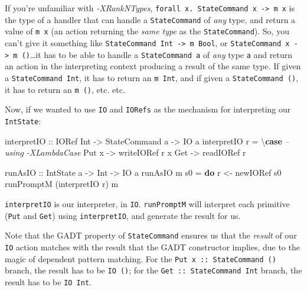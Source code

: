 \documentclass[]{article}
\newenvironment{Shaded}{}{}
\newcommand{\CommentTok}[1]{\textcolor[rgb]{0.38,0.63,0.69}{\textit{#1}}}
\newcommand{\DataTypeTok}[1]{\textcolor[rgb]{0.56,0.13,0.00}{#1}}
\newcommand{\FunctionTok}[1]{\textcolor[rgb]{0.02,0.16,0.49}{#1}}
\newcommand{\KeywordTok}[1]{\textcolor[rgb]{0.00,0.44,0.13}{\textbf{#1}}}
\newcommand{\NormalTok}[1]{#1}
\newcommand{\OtherTok}[1]{\textcolor[rgb]{0.00,0.44,0.13}{#1}}
\begin{document}
If you're unfamiliar with \emph{-XRankNTypes},
\texttt{forall\ x.\ StateCommand\ x\ -\textgreater{}\ m\ x} is the type of a
handler that can handle a \texttt{StateCommand} of \emph{any} type, and return a
value of \texttt{m\ x} (an action returning the \emph{same type} as the
\texttt{StateCommand}). So, you can't give it something like
\texttt{StateCommand\ Int\ -\textgreater{}\ m\ Bool}, or
\texttt{StateCommand\ x\ -\textgreater{}\ m\ ()}\ldots{}it has to be able to
handle a \texttt{StateCommand\ a} of \emph{any} type \texttt{a} and return an
action in the interpreting context producing a result of the same type. If given
a \texttt{StateCommand\ Int}, it has to return an \texttt{m\ Int}, and if given
a \texttt{StateCommand\ ()}, it has to return an \texttt{m\ ()}, etc. etc.

Now, if we wanted to use \texttt{IO} and \texttt{IORefs} as the mechanism for
interpreting our \texttt{IntState}:

\begin{Shaded}
\begin{Highlighting}[]
\NormalTok{interpretIO}
\OtherTok{    ::} \DataTypeTok{IORef} \DataTypeTok{Int}
    \OtherTok{->} \DataTypeTok{StateCommand}\NormalTok{ a}
    \OtherTok{->} \DataTypeTok{IO}\NormalTok{ a}
\NormalTok{interpretIO r }\FunctionTok{=}\NormalTok{ \textbackslash{}}\KeywordTok{case}           \CommentTok{-- using -XLambdaCase}
    \DataTypeTok{Put}\NormalTok{ x }\OtherTok{->}\NormalTok{ writeIORef r x}
    \DataTypeTok{Get}   \OtherTok{->}\NormalTok{ readIORef r}

\OtherTok{runAsIO ::} \DataTypeTok{IntState}\NormalTok{ a }\OtherTok{->} \DataTypeTok{Int} \OtherTok{->} \DataTypeTok{IO}\NormalTok{ a}
\NormalTok{runAsIO m s0 }\FunctionTok{=} \KeywordTok{do}
\NormalTok{    r }\OtherTok{<-}\NormalTok{ newIORef s0}
\NormalTok{    runPromptM (interpretIO r) m}
\end{Highlighting}
\end{Shaded}

\texttt{interpretIO} is our interpreter, in \texttt{IO}. \texttt{runPromptM}
will interpret each primitive (\texttt{Put} and \texttt{Get}) using
\texttt{interpretIO}, and generate the result for us.

Note that the GADT property of \texttt{StateCommand} ensures us that the
\emph{result} of our \texttt{IO} action matches with the result that the GADT
constructor implies, due to the magic of dependent pattern matching. For the
\texttt{Put\ x\ ::\ StateCommand\ ()} branch, the result has to be
\texttt{IO\ ()}; for the \texttt{Get\ ::\ StateCommand\ Int} branch, the result
has to be \texttt{IO\ Int}.
\end{document}

